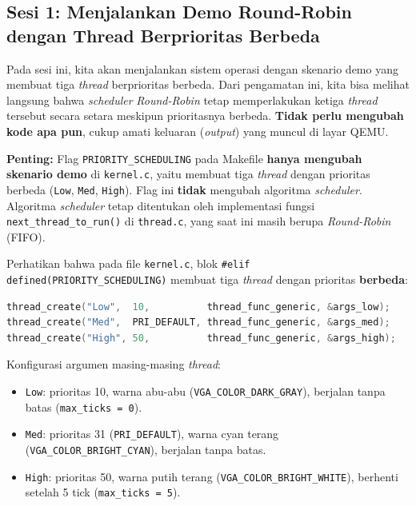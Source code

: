 \subsection{Sesi 1: Menjalankan Demo Round-Robin dengan Thread Berprioritas Berbeda}
\label{sec:m11-sesi-1}

Pada sesi ini, kita akan menjalankan sistem operasi dengan skenario demo yang membuat tiga \textit{thread} berprioritas berbeda. Dari pengamatan ini, kita bisa melihat langsung bahwa \textit{scheduler} \textit{Round-Robin} tetap memperlakukan ketiga \textit{thread} tersebut secara setara meskipun prioritasnya berbeda. \textbf{Tidak perlu mengubah kode apa pun}, cukup amati keluaran (\textit{output}) yang muncul di layar QEMU.

\textbf{Penting:} Flag \texttt{PRIORITY\_SCHEDULING} pada Makefile \textbf{hanya mengubah skenario demo} di \texttt{kernel.c}, yaitu membuat tiga \textit{thread} dengan prioritas berbeda (\texttt{Low}, \texttt{Med}, \texttt{High}). Flag ini \textbf{tidak} mengubah algoritma \textit{scheduler}. Algoritma \textit{scheduler} tetap ditentukan oleh implementasi fungsi \texttt{next\_thread\_to\_run()} di \texttt{thread.c}, yang saat ini masih berupa \textit{Round-Robin} (FIFO).

Perhatikan bahwa pada file \texttt{kernel.c}, blok \texttt{\#elif defined(\allowbreak PRIORITY\_SCHEDULING)} membuat tiga \textit{thread} dengan prioritas \textbf{berbeda}:

\begin{lstlisting}[language=C, caption={Pembuatan thread dengan prioritas berbeda di kernel.c}]
thread_create("Low",  10,          thread_func_generic, &args_low);
thread_create("Med",  PRI_DEFAULT, thread_func_generic, &args_med);
thread_create("High", 50,          thread_func_generic, &args_high);
\end{lstlisting}

Konfigurasi argumen masing-masing \textit{thread}:
\begin{itemize}
	\item \texttt{Low}: prioritas 10, warna abu-abu (\texttt{VGA\_COLOR\_DARK\_GRAY}), berjalan tanpa batas (\texttt{max\_ticks = 0}).
	\item \texttt{Med}: prioritas 31 (\texttt{PRI\_DEFAULT}), warna cyan terang (\texttt{VGA\_COLOR\_BRIGHT\_CYAN}), berjalan tanpa batas.
	\item \texttt{High}: prioritas 50, warna putih terang (\texttt{VGA\_COLOR\_BRIGHT\_WHITE}), berhenti setelah 5 tick (\texttt{max\_ticks = 5}).
\end{itemize}

